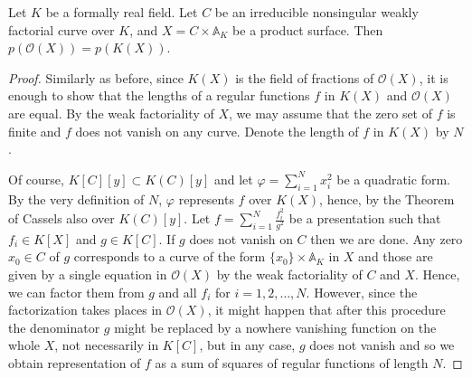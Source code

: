 \documentclass[10pt,a4paper]{amsart}
\newcommand{\OO}{\mathcal{O}}
\begin{document}
\begin{thm}\label{main}
Let $K$ be a formally real field. Let $C$ be an irreducible nonsingular weakly factorial curve over $K$, and $X=C\times \mathbb{A}_K$ be a product surface. Then $p(\OO(X))=p(K(X))$.

\begin{proof}
Similarly as before, since $K(X)$ is the field of fractions of $\OO(X)$, it is enough to show that the lengths of a regular functions $f$ in $K(X)$ and $\OO(X)$ are equal. By the weak factoriality of $X$, we may assume that the zero set of $f$ is finite and $f$ does not vanish on any curve. Denote the length of $f$ in $K(X)$ by $N$.






Of course, $K[C][y] \subset K(C)[y]$ and let $\varphi = \sum_{i=1}^N x_i^2$ be a quadratic form. By the very definition of $N$, $\varphi$ represents $f$ over $K(X)$, hence, by the Theorem of Cassels also over $K(C)[y]$. Let $f=\sum_{i=1}^N \frac{f_i^2}{g^2}$ be a presentation such that $f_i \in K[X]$ and $g \in K[C]$. If $g$ does not vanish on $C$ then we are done. Any zero $x_0 \in C$ of $g$ corresponds to a curve of the form $\{x_0 \} \times \mathbb{A}_K$ in $X$ and those are given by a single equation in $\OO(X)$ by the weak factoriality of $C$ and $X$. Hence, we can factor them from $g$ and all $f_i$ for $i=1,2,\dots, N$. However, since the factorization takes places in $\OO(X)$, it might happen that after this procedure the denominator $g$ might be replaced by a nowhere vanishing function on the whole $X$, not necessarily in $K[C]$, but in any case, $g$ does not vanish and so we obtain representation of $f$ as a sum of squares of regular functions of length $N$.



\end{proof}
\end{thm}
\end{document}
